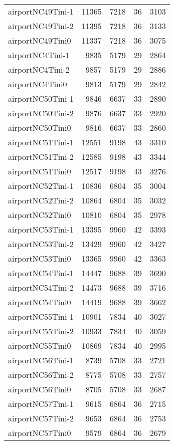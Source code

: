 \begin{longtable}{lrrrr}
airportNC49Tini-1 & 11365 & 7218 & 36 & 3103 \\
airportNC49Tini-2 & 11395 & 7218 & 36 & 3133 \\
airportNC49Tini0 & 11337 & 7218 & 36 & 3075 \\
airportNC4Tini-1 & 9835 & 5179 & 29 & 2864 \\
airportNC4Tini-2 & 9857 & 5179 & 29 & 2886 \\
airportNC4Tini0 & 9813 & 5179 & 29 & 2842 \\
airportNC50Tini-1 & 9846 & 6637 & 33 & 2890 \\
airportNC50Tini-2 & 9876 & 6637 & 33 & 2920 \\
airportNC50Tini0 & 9816 & 6637 & 33 & 2860 \\
airportNC51Tini-1 & 12551 & 9198 & 43 & 3310 \\
airportNC51Tini-2 & 12585 & 9198 & 43 & 3344 \\
airportNC51Tini0 & 12517 & 9198 & 43 & 3276 \\
airportNC52Tini-1 & 10836 & 6804 & 35 & 3004 \\
airportNC52Tini-2 & 10864 & 6804 & 35 & 3032 \\
airportNC52Tini0 & 10810 & 6804 & 35 & 2978 \\
airportNC53Tini-1 & 13395 & 9960 & 42 & 3393 \\
airportNC53Tini-2 & 13429 & 9960 & 42 & 3427 \\
airportNC53Tini0 & 13365 & 9960 & 42 & 3363 \\
airportNC54Tini-1 & 14447 & 9688 & 39 & 3690 \\
airportNC54Tini-2 & 14473 & 9688 & 39 & 3716 \\
airportNC54Tini0 & 14419 & 9688 & 39 & 3662 \\
airportNC55Tini-1 & 10901 & 7834 & 40 & 3027 \\
airportNC55Tini-2 & 10933 & 7834 & 40 & 3059 \\
airportNC55Tini0 & 10869 & 7834 & 40 & 2995 \\
airportNC56Tini-1 & 8739 & 5708 & 33 & 2721 \\
airportNC56Tini-2 & 8775 & 5708 & 33 & 2757 \\
airportNC56Tini0 & 8705 & 5708 & 33 & 2687 \\
airportNC57Tini-1 & 9615 & 6864 & 36 & 2715 \\
airportNC57Tini-2 & 9653 & 6864 & 36 & 2753 \\
airportNC57Tini0 & 9579 & 6864 & 36 & 2679 \\

\end{longtable}
